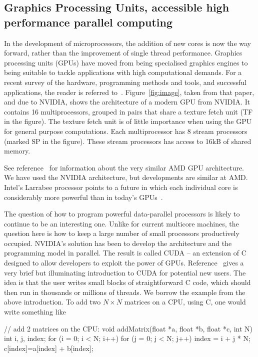 \subsection{Graphics Processing Units, accessible high performance parallel computing}
\label{sec:gpu}

In the development of microprocessors, the addition of new cores is now the
way forward, rather than the improvement of single thread performance.
Graphics processing units (GPUs) have moved from being specialised graphics
engines to being suitable to tackle applications with high computational
demands. For a recent survey of the hardware, programming methods and tools,
and successful applications, the reader is referred to~\cite{GPUComputing}.
Figure~\ref{fig:image}, taken from that paper, and due to NVIDIA, shows the
architecture of a modern GPU from NVIDIA. It contains 16 multiprocessors, 
grouped in pairs that share a texture fetch unit (TF in the figure). The 
texture fetch unit is of little importance when using the GPU for general 
purpose computations. Each multiprocessor has 8 stream processors (marked 
SP in the figure). These stream processors has access to 16kB of shared memory.  

See reference~\cite{GPUComputing} for information about
the very similar AMD GPU architecture. We have used the NVIDIA architecture,
but developments are similar at AMD. Intel's Larrabee processor points to a
future in which each individual core is considerably more powerful than in
today's GPUs~\cite{larrabee}.


The question of how to program powerful data-parallel processors is likely
to continue to be an interesting one. Unlike for current multicore machines,
the question here is how to keep a large number of small processors
productively occupied. NVIDIA's solution has been to develop the
architecture and the programming model in parallel. The result is called
CUDA -- an extension of C designed to allow developers to exploit the power
of GPUs. Reference~\cite{GPUCudaLuebke} gives a very brief but illuminating
introduction to CUDA for potential new users. The idea is that the user
writes small blocks of straightforward C code, which should then run in
thousands or millions of threads. We borrow the example from the above
introduction. To add two $N \times N$ matrices on a CPU, using C, one would
write something like

\begin{code}
// add 2 matrices on the CPU:
void addMatrix(float *a, float *b, float *c, int N)
{
  int i, j, index;
  for (i = 0; i < N; i++) {
    for (j = 0; j < N; j++) {
      index = i + j * N;
      c[index]=a[index] + b[index];
    }
  }
}
\end{code}
\FloatBarrier


